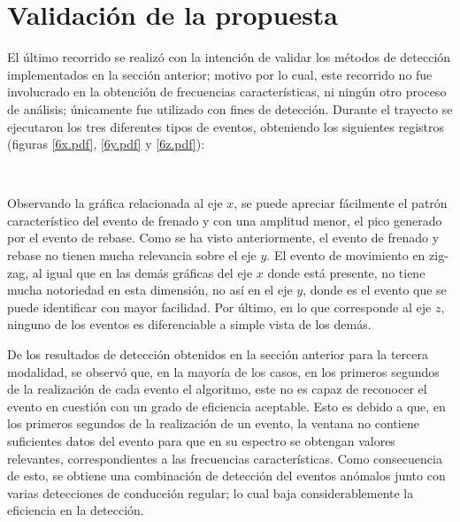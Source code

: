 \pagebreak

\section{Validación de la propuesta}

El último recorrido se realizó con la intención de validar los métodos de detección implementados en la sección anterior; motivo por lo cual, este recorrido no fue involucrado en la obtención de frecuencias características, ni ningún otro proceso de análisis; únicamente fue utilizado con fines de detección.
Durante el trayecto se ejecutaron los tres diferentes tipos de eventos, obteniendo los siguientes registros (figuras \ref{6x.pdf}, \ref{6y.pdf} y \ref{6z.pdf}):

\vspace{12.2cm}
\pagebreak
\ \\
\vspace{27cm}
\pagebreak

Observando la gráfica relacionada al eje $x$, se puede apreciar fácilmente el patrón característico del evento de frenado y con una amplitud menor, el pico generado por el evento de rebase. 
Como se ha visto anteriormente, el evento de frenado y rebase no tienen mucha relevancia sobre el eje $y$.
El evento de movimiento en zig-zag, al igual que en las demás gráficas del eje $x$ donde está presente, no tiene mucha notoriedad en esta dimensión, no así en el eje $y$, donde es el evento que se puede identificar con mayor facilidad. 
Por último, en lo que corresponde al eje $z$, ninguno de los eventos es diferenciable a simple vista de los demás.

De los resultados de detección obtenidos en la sección anterior para la tercera modalidad, se observó que, en la mayoría de los casos, en los primeros segundos de la realización de cada evento el algoritmo, este no es capaz de reconocer el evento en cuestión con un grado de eficiencia aceptable.
Esto es debido a que, en los primeros segundos de la realización de un evento, la ventana no contiene suficientes datos del evento para que en su espectro se obtengan valores relevantes, correspondientes a las frecuencias características.
Como consecuencia de esto, se obtiene una combinación de detección del eventos anómalos junto con varias detecciones de conducción regular; lo cual baja considerablemente la eficiencia en la detección.


